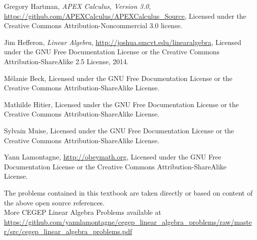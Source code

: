 

\begin{thebibliography}{9}
\label{label:authors}
Gregory Hartman,
\emph{APEX Calculus, Version 3.0},
\url{https://github.com/APEXCalculus/APEXCalculus_Source},
Licensed under the
Creative Commons Attribution-Noncommercial 3.0 license.


 

Jim Hefferon,
\emph{Linear Algebra},
\url{http://joshua.smcvt.edu/linearalgebra},
Licensed under the GNU Free Documentation License or the 
Creative Commons Attribution-ShareAlike 2.5 License,
2014.


M\'elanie Beck,
Licensed under the GNU Free Documentation License or the
Creative Commons Attribution-ShareAlike License.



Mathilde Hitier,
Licensed under the GNU Free Documentation License or the
Creative Commons Attribution-ShareAlike License.



Sylvain Muise,
Licensed under the GNU Free Documentation License or the
Creative Commons Attribution-ShareAlike License.



Yann Lamontagne,
\url{http://obeymath.org},
Licensed under the GNU Free Documentation License or the 
Creative Commons Attribution-ShareAlike License.

\end{thebibliography}
The problems contained in this textbook are taken directly or based on content of the above open source references.
\\

More CEGEP Linear Algebra Problems available at \url{https://github.com/yannlamontagne/cegep_linear_algebra_problems/raw/master/src/cegep_linear_algebra_problems.pdf}
